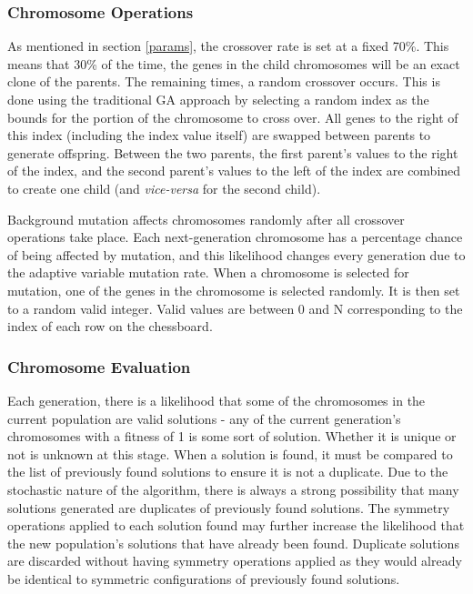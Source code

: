 \documentclass{sig-alternate}
\begin{document}
\subsubsection{Chromosome Operations}
As mentioned in section \ref{params}, the crossover rate is set at a fixed 70\%. This means that 30\% of the time, the genes in the child chromosomes will be an exact clone of the parents. The remaining times, a random crossover occurs. This is done using the traditional GA approach by selecting a random index as the bounds for the portion of the chromosome to cross over. All genes to the right of this index (including the index value itself) are swapped between parents to generate offspring. Between the two parents, the first parent's values to the right of the index, and the second parent's values to the left of the index are combined to create one child (and \textit{vice-versa} for the second child).

Background mutation affects chromosomes randomly after all crossover operations take place. Each next-generation chromosome has a percentage chance of being affected by mutation, and this likelihood changes every generation due to the adaptive variable mutation rate. When a chromosome is selected for mutation, one of the genes in the chromosome is selected randomly. It is then set to a random valid integer. Valid values are between 0 and N corresponding to the index of each row on the chessboard.

\subsubsection{Chromosome Evaluation}
Each generation, there is a likelihood that some of the chromosomes in the current population are valid solutions - any of the current generation's chromosomes with a fitness of 1 is some sort of solution. Whether it is unique or not is unknown at this stage. When a solution is found, it must be compared to the list of previously found solutions to ensure it is not a duplicate. Due to the stochastic nature of the algorithm, there is always a strong possibility that many solutions generated are duplicates of previously found solutions. The symmetry operations applied to each solution found may further increase the likelihood that the new population's solutions that have already been found. Duplicate solutions are discarded without having symmetry operations applied as they would already be identical to symmetric configurations of previously found solutions.
\end{document}
